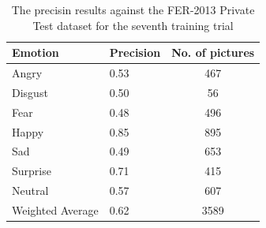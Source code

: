 \documentclass[runningheads,a4paper,11pt]{report}
\begin{document}
\begin{table}[htbp]
	\caption{The precisin results against the FER-2013 Private Test dataset for the seventh training trial}
	\label{fer_training_28k_001_squared_hinge_loss_private_test}
		\begin{center}
			\begin{tabular}{p{110pt}p{110pt}c}
				\textbf{Emotion}& \textbf{Precision}& \textbf{No. of pictures} \\
				\hline\hline
				Angry& 0.53& 467 \\
				Disgust& 0.50& 56 \\
				Fear& 0.48& 496 \\
				Happy& 0.85& 895 \\
				Sad& 0.49& 653 \\
				Surprise& 0.71& 415 \\
				Neutral& 0.57& 607 \\
				\hline
				Weighted Average& 0.62 &3589
			\end{tabular}
		\end{center}
\end{table}
\end{document}
